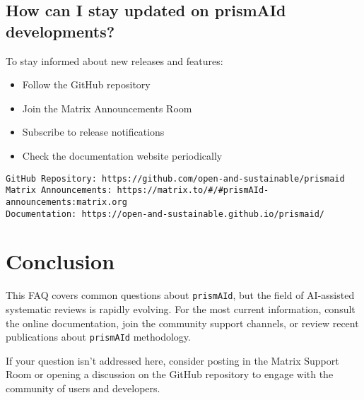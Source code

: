 
\subsection{How can I stay updated on prismAId developments?}

To stay informed about new releases and features:

\begin{itemize}
    \item Follow the GitHub repository
    \item Join the Matrix Announcements Room
    \item Subscribe to release notifications
    \item Check the documentation website periodically
\end{itemize}

\begin{commandbox}
\begin{lstlisting}
GitHub Repository: https://github.com/open-and-sustainable/prismaid
Matrix Announcements: https://matrix.to/#/#prismAId-announcements:matrix.org
Documentation: https://open-and-sustainable.github.io/prismaid/
\end{lstlisting}
\end{commandbox}


\section{Conclusion}

This FAQ covers common questions about \texttt{prismAId}, but the field of AI-assisted systematic reviews is rapidly evolving. For the most current information, consult the online documentation, join the community support channels, or review recent publications about \texttt{prismAId} methodology.

If your question isn't addressed here, consider posting in the Matrix Support Room or opening a discussion on the GitHub repository to engage with the community of users and developers.
